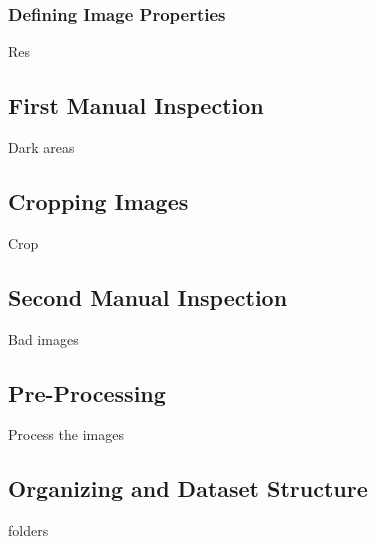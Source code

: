 \subsubsection{Defining Image Properties}

Res

\subsection{First Manual Inspection}

Dark areas

\subsection{Cropping Images}

Crop

\subsection{Second Manual Inspection}

Bad images

\subsection{Pre-Processing}

Process the images

\subsection{Organizing and Dataset Structure}

folders